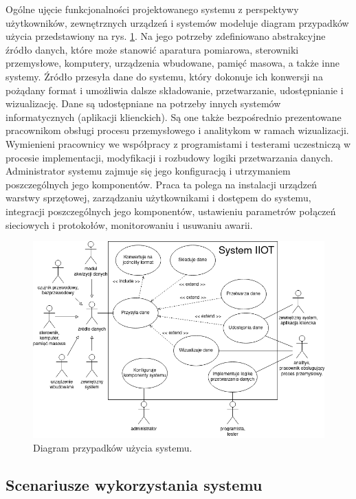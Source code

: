 \documentclass[a4paper, 12pt, twoside]{article}
\begin{document}
Ogólne ujęcie funkcjonalności projektowanego systemu z perspektywy użytkowników,
zewnętrznych urządzeń i systemów modeluje diagram przypadków użycia przedstawiony
na rys. \ref{fig:use-case}. Na jego potrzeby zdefiniowano abstrakcyjne
źródło danych, które może stanowić aparatura pomiarowa, sterowniki przemysłowe, komputery,
urządzenia wbudowane, pamięć masowa, a także inne systemy. Źródło przesyła
dane do systemu, który dokonuje ich konwersji na pożądany format i umożliwia
dalsze składowanie, przetwarzanie, udostępnianie i wizualizację. Dane są
udostępniane na potrzeby innych systemów informatycznych (aplikacji klienckich).
Są one także bezpośrednio prezentowane pracownikom obsługi procesu przemysłowego
i analitykom w ramach wizualizacji. Wymienieni pracownicy we
współpracy z programistami i testerami uczestniczą
w procesie implementacji, modyfikacji i rozbudowy logiki przetwarzania danych.
Administrator systemu zajmuje się jego konfiguracją i utrzymaniem
poszczególnych jego komponentów. Praca ta polega na
instalacji urządzeń warstwy sprzętowej, zarządzaniu
użytkownikami i dostępem do systemu, integracji poszczególnych jego komponentów,
ustawieniu parametrów połączeń sieciowych i protokołów, monitorowaniu
i usuwaniu awarii.

\begin{figure}
      \centering
      \includegraphics[width=\textwidth]{use-case.png}
      \caption{Diagram przypadków użycia systemu.}
      \label{fig:use-case}
\end{figure}

\subsection{Scenariusze wykorzystania systemu}\label{scenariusze}
\end{document}
